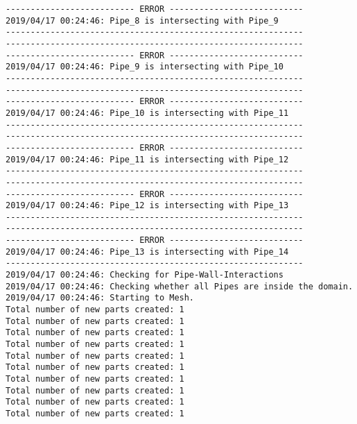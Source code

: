 \documentclass{article}
\begin{document}
{\begin{verbatim}
-------------------------- ERROR ---------------------------
2019/04/17 00:24:46: Pipe_8 is intersecting with Pipe_9
------------------------------------------------------------
------------------------------------------------------------
-------------------------- ERROR ---------------------------
2019/04/17 00:24:46: Pipe_9 is intersecting with Pipe_10
------------------------------------------------------------
------------------------------------------------------------
-------------------------- ERROR ---------------------------
2019/04/17 00:24:46: Pipe_10 is intersecting with Pipe_11
------------------------------------------------------------
------------------------------------------------------------
-------------------------- ERROR ---------------------------
2019/04/17 00:24:46: Pipe_11 is intersecting with Pipe_12
------------------------------------------------------------
------------------------------------------------------------
-------------------------- ERROR ---------------------------
2019/04/17 00:24:46: Pipe_12 is intersecting with Pipe_13
------------------------------------------------------------
------------------------------------------------------------
-------------------------- ERROR ---------------------------
2019/04/17 00:24:46: Pipe_13 is intersecting with Pipe_14
------------------------------------------------------------
2019/04/17 00:24:46: Checking for Pipe-Wall-Interactions
2019/04/17 00:24:46: Checking whether all Pipes are inside the domain.
2019/04/17 00:24:46: Starting to Mesh.
Total number of new parts created: 1
Total number of new parts created: 1
Total number of new parts created: 1
Total number of new parts created: 1
Total number of new parts created: 1
Total number of new parts created: 1
Total number of new parts created: 1
Total number of new parts created: 1
Total number of new parts created: 1
Total number of new parts created: 1
\end{verbatim}
}
\clearpage
\end{document}
